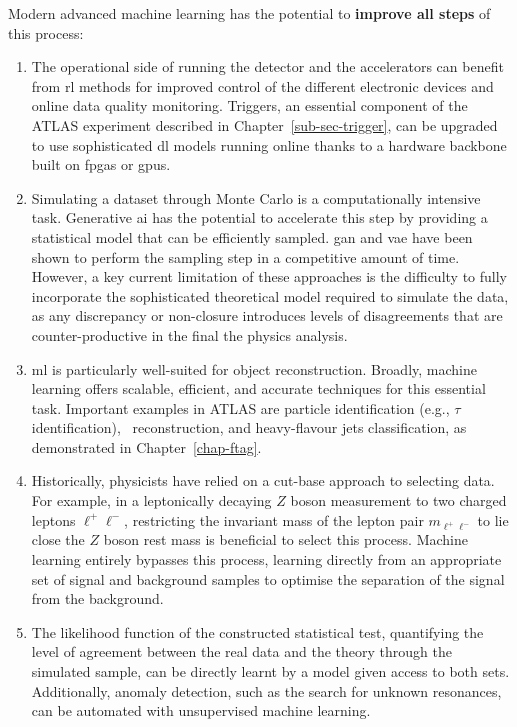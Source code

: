 Modern advanced machine learning has the potential to \textbf{improve all steps} of this process:
\begin{enumerate}
    \item The operational side of running the detector and the accelerators can benefit from \gls{rl} methods for improved control of the different electronic devices and online data quality monitoring. Triggers, an essential component of the ATLAS experiment described in Chapter~\ref{sub-sec-trigger}, can be upgraded to use sophisticated \gls{dl} models running online thanks to a hardware backbone built on \glspl{fpga} or \glspl{gpu}.
    \item Simulating a dataset through Monte Carlo is a computationally intensive task. Generative \gls{ai} has the potential to accelerate this step by providing a statistical model that can be efficiently sampled. \gls{gan} and \gls{vae} have been shown to perform the sampling step in a competitive amount of time. However, a key current limitation of these approaches is the difficulty to fully incorporate the sophisticated theoretical model required to simulate the data, as any discrepancy or non-closure introduces levels of disagreements that are counter-productive in the final the physics analysis.
    \item \gls{ml} is particularly well-suited for object reconstruction. Broadly, machine learning offers scalable, efficient, and accurate techniques for this essential task. Important examples in ATLAS are particle identification (e.g., $\tau$ identification), \etm\ reconstruction, and heavy-flavour jets classification, as demonstrated in Chapter~\ref{chap-ftag}.
    \item Historically, physicists have relied on a cut-base approach to selecting data. For example, in a leptonically decaying $Z$ boson measurement to two charged leptons $\ell^+\ell^-$, restricting the invariant mass of the lepton pair $m_{\ell^+\ell^-}$ to lie close the $Z$ boson rest mass is beneficial to select this process. Machine learning entirely bypasses this process, learning directly from an appropriate set of signal and background samples to optimise the separation of the signal from the background. 
    \item The likelihood function of the constructed statistical test, quantifying the level of agreement between the real data and the theory through the simulated sample, can be directly learnt by a model given access to both sets. Additionally, anomaly detection, such as the search for unknown resonances, can be automated with unsupervised machine learning. 
\end{enumerate}

